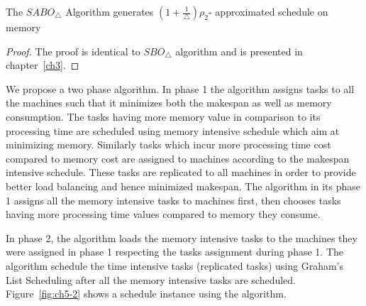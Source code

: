    \begin{theorem} \label{th:chapter5-2b}
     The $SABO_\triangle$ Algorithm generates $ (1+\frac{1}{\triangle})\rho_2 $- approximated schedule on memory 
      \end{theorem}                      
      \begin{proof}  
      The proof is identical to $SBO_\triangle$ algorithm and is presented in chapter~\ref{ch3}.                                           
      \end{proof}    
 
 We propose a two phase algorithm. In phase 1 the algorithm assigns tasks to all the machines such that it minimizes both the makespan as well as memory consumption. The tasks having more memory value  in comparison to its processing time are scheduled using memory intensive schedule which aim at minimizing memory.  Similarly tasks which incur more processing time cost compared to memory cost are assigned to machines according to the makespan intensive schedule. These   tasks are replicated to all machines in order to provide better load balancing and hence minimized makespan. The algorithm in its phase 1 assigns all the memory intensive tasks to machines first, then chooses tasks having more processing time values compared to memory they consume.
 
 In phase 2, the algorithm loads the memory intensive  tasks to the machines they were assigned in phase 1 respecting the tasks assignment during phase 1. The algorithm schedule the time intensive tasks (replicated tasks) using Graham's List Scheduling after all the memory intensive tasks are scheduled. Figure~\ref{fig:ch5-2} shows a schedule instance using the algorithm.\\
 
